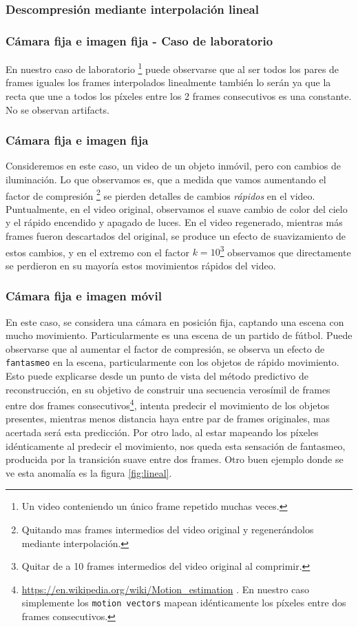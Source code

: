 \subsubsection{\bf{Descompresión mediante interpolación lineal}}
\subsubsection*{Cámara fija e imagen fija - Caso de laboratorio}
En nuestro caso de laboratorio \footnote{Un video conteniendo un único frame repetido muchas veces.} puede observarse que al ser todos los pares de frames iguales los frames interpolados linealmente también lo serán ya que la recta que une a todos los píxeles entre los 2 frames consecutivos es una constante. No se observan artifacts.

\subsubsection*{Cámara fija e imagen fija}
Consideremos en este caso, un video de un objeto inmóvil, pero con cambios de iluminación. Lo que observamos es, que a medida que vamos aumentando el factor de compresión \footnote{Quitando mas frames intermedios del video original y regenerándolos mediante interpolación.} se pierden detalles de cambios \emph{rápidos} en el video. Puntualmente, en el video original, observamos el suave cambio de color del cielo y el rápido encendido y apagado de luces. En el video regenerado, mientras más frames fueron descartados del original, se produce un efecto de suavizamiento de estos cambios, y en el extremo con el factor $k = 10$\footnote{Quitar de a 10 frames intermedios del video original al comprimir.} observamos que directamente se perdieron en su mayoría estos movimientos rápidos del video.

\subsubsection*{Cámara fija e imagen móvil}
En este caso, se considera una cámara en posición fija, captando una escena con mucho movimiento. Particularmente es una escena de un partido de fútbol. Puede observarse que al aumentar el factor de compresión, se observa un efecto de \texttt{fantasmeo} en la escena, particularmente con los objetos de rápido movimiento. Esto puede explicarse desde un punto de vista del método predictivo de reconstrucción, en su objetivo de construir una secuencia verosímil de frames entre dos frames consecutivos\footnote{\url{https://en.wikipedia.org/wiki/Motion_estimation} . En nuestro caso simplemente los \texttt{motion vectors} mapean idénticamente los píxeles entre dos frames consecutivos.}, intenta predecir el movimiento de los objetos presentes, mientras menos distancia haya entre par de frames originales, mas acertada será esta predicción. Por otro lado, al estar mapeando los píxeles idénticamente al predecir el movimiento, nos queda esta sensación de fantasmeo, producida por la transición suave entre dos frames. Otro buen ejemplo donde se ve esta anomalía es la figura \ref{fig:lineal}.

